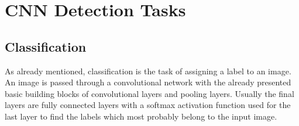 %
%
%
%


\section{CNN Detection Tasks}
\subsection{Classification}
\label{classification}
As already mentioned, classification is the task of assigning a label to an image.
An image is passed through a convolutional network with the already presented basic building blocks of convolutional
layers and pooling layers.
Usually the final layers are fully connected layers with a softmax activation function
used for the last layer to find the labels which most probably belong to the input image.
